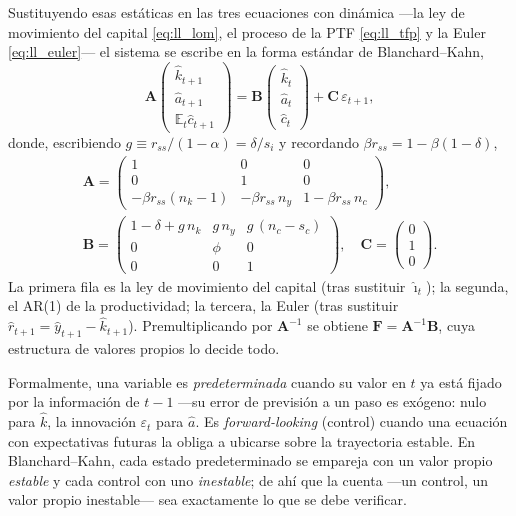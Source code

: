 \documentclass[11pt,a4paper]{report}
\newcounter{tcbrem}[section]
\renewcommand{\thetcbrem}{\thesection.\arabic{tcbrem}}
\newenvironment{remark}{%
  \refstepcounter{tcbrem}%
  \begin{tcolorbox}[remarkstyle, title={Observación~\thetcbrem}]}%
{\end{tcolorbox}}
\newcommand{\E}{\mathbb{E}}
\begin{document}
Sustituyendo esas estáticas en las tres ecuaciones con dinámica ---la ley de
movimiento del capital \eqref{eq:ll_lom}, el proceso de la PTF \eqref{eq:ll_tfp}
y la Euler \eqref{eq:ll_euler}--- el sistema se escribe en la forma estándar de
Blanchard--Kahn,
\begin{equation}
\mathbf{A}\begin{pmatrix}\hat{k}_{t+1}\\[2pt]\hat{a}_{t+1}\\[2pt]\E_t\hat{c}_{t+1}\end{pmatrix}
=\mathbf{B}\begin{pmatrix}\hat{k}_{t}\\[2pt]\hat{a}_{t}\\[2pt]\hat{c}_{t}\end{pmatrix}
+\mathbf{C}\,\varepsilon_{t+1}, \label{eq:ABC}
\end{equation}
donde, escribiendo $g\equiv r_{ss}/(1-\alpha)=\delta/s_i$ y recordando
$\beta r_{ss}=1-\beta(1-\delta)$,
\begin{equation}
\begin{gathered}
\mathbf{A}=\begin{pmatrix}
1 & 0 & 0\\[2pt]
0 & 1 & 0\\[2pt]
-\beta r_{ss}(n_k-1) & -\beta r_{ss}\,n_y & 1-\beta r_{ss}\,n_c
\end{pmatrix},\\[4pt]
\mathbf{B}=\begin{pmatrix}
1-\delta+g\,n_k & g\,n_y & g\,(n_c-s_c)\\[2pt]
0 & \phi & 0\\[2pt]
0 & 0 & 1
\end{pmatrix},\quad
\mathbf{C}=\begin{pmatrix}0\\1\\0\end{pmatrix}.
\end{gathered}
\label{eq:ABCmat}
\end{equation}
La primera fila es la ley de movimiento del capital (tras sustituir
$\hat{\imath}_t$); la segunda, el AR(1) de la productividad; la tercera, la Euler
(tras sustituir $\hat{r}_{t+1}=\hat{y}_{t+1}-\hat{k}_{t+1}$). Premultiplicando por
$\mathbf{A}^{-1}$ se obtiene $\mathbf{F}=\mathbf{A}^{-1}\mathbf{B}$, cuya
estructura de valores propios lo decide todo.

\begin{remark}
Formalmente, una variable es \emph{predeterminada} cuando su valor en $t$ ya está
fijado por la información de $t-1$ ---su error de previsión a un paso es
exógeno: nulo para $\hat{k}$, la innovación $\varepsilon_t$ para $\hat{a}$. Es
\emph{forward-looking} (control) cuando una ecuación con expectativas futuras la
obliga a ubicarse sobre la trayectoria estable. En Blanchard--Kahn, cada estado
predeterminado se empareja con un valor propio \emph{estable} y cada control con
uno \emph{inestable}; de ahí que la cuenta ---un control, un valor propio
inestable--- sea exactamente lo que se debe verificar.
\end{remark}
\end{document}
